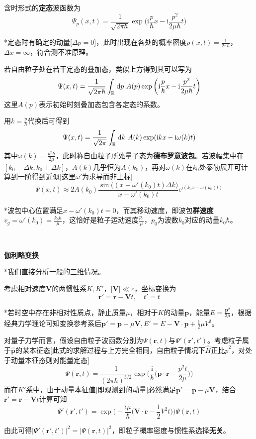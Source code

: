 \documentclass[a4paper,UTF8,fontset=windows]{ctexart}
\newcommand*{\dr}{\hspace{0.07em}\mathrm{d}}
\newcommand*{\ir}{\mathrm{i}}
\newcommand*{\er}{\mathrm{e}}
\newcommand*{\br}{\mathbf{r}}
\newcommand*{\bp}{\mathbf{p}}
\begin{document}
含时形式的\textbf{定态}波函数为
$$\Psi_p(x,t)=\frac{1}{\sqrt{2\pi\hbar}}\exp\bigg(\ir\frac{p}{\hbar}x-\ir\frac{p^2}{2\mu\hbar}t\bigg)$$

*定态时有确定的动量[$\Delta p=0$]，此时出现在各处的概率密度$\rho(x,t)=\frac{1}{2\pi\hbar}$，$\Delta x=\infty$，符合测不准原理。

若自由粒子处在若干定态的叠加态，类似上方得到其可以写为
$$\Psi(x,t)=\frac{1}{\sqrt{2\pi\hbar}}\int_\mathbb{R}\dr p\ A(p)\exp\bigg(\ir\frac{p}{\hbar}x-\ir\frac{p^2}{2\mu\hbar}t\bigg)$$
这里$A(p)$表示初始时刻叠加态包含各定态的系数。

用$k=\frac{p}{\hbar}$代换后可得到
$$\Psi(x,t)=\frac{1}{\sqrt{2\pi}}\int_\mathbb{R}\dr k\ A(k)\exp(\ir kx-\ir\omega(k)t)$$
其中$\omega(k)=\frac{k^2\hbar}{2\mu}$，此时称自由粒子所处量子态为\textbf{德布罗意波包}。若波幅集中在$[k_0-\Delta k,k_0+\Delta k]$，$A(k)$几乎恒为$A(k_0)$，再对$\omega(k)$在$k_0$处泰勒展开可计算到一阶得到近似[这里$\omega'$为求导而非上标]
$$\Psi(x,t)\approx 2A(k_0)\frac{\sin\big((x-\omega'(k_0)t)\Delta k\big)}{x-\omega'(k_0)t}\er^{\ir(k_0x-\omega(k_0)t)}$$

*波包中心位置满足$x-\omega'(k_0)t=0$，而其移动速度，即波包\textbf{群速度}$v_g=\omega'(k_0)=\frac{k_0\hbar}{\mu}$，这恰好是粒子运动速度$\frac{p_0}{\mu}$，$p_0$为波数$k_0$对应的动量$k_0\hbar$。

\

\textbf{伽利略变换}

*我们直接分析一般的三维情况。

考虑相对速度$\mathbf{V}$的两惯性系$K,K'$，$|\mathbf{V}|\ll c$，坐标变换为
$$\br'=\br-\mathbf{V}t,\quad t'=t$$

*若时空中存在非相对性质点，静止质量$\mu$，相对于$K$的动量$\bp$，能量$E=\frac{\bp^2}{2\mu}$，根据经典力学理论可知变换参考系后$\bp'=\bp-\mu\mathbf{V},E'=E-\mathbf{V}\cdot\bp+\frac{1}{2}\mu V^2$。

对量子力学而言，假设自由粒子波函数分别为$\Psi(\br,t)$与$\Psi'(\br',t')$。考虑粒子属于$\hat{\bp}$的某本征态[此式的求解过程与上方完全相同，自由粒子情况下$\hat{H}$正比$\hat{p}^2$，对处于动量本征态则对能量定态]
$$\Psi(\br,t)=\frac{1}{(2\pi\hbar)^{3/2}}\exp\bigg(\frac{\ir}{\hbar}\bigg(\bp\cdot\br-\frac{p^2t}{2\mu}\bigg)\bigg)$$
而在$K'$系中，由于动量本征值[即观测到的动量]必然满足$\bp'=\bp-\mu\mathbf{V}$，结合$\br'=\br-\mathbf{V}t$计算可知
$$\Psi'(\br',t')=\exp\bigg(-\frac{\ir\mu}{\hbar}\bigg(\mathbf{V}\cdot\br-\frac{1}{2}V^2t\bigg)\bigg)\Psi(\br,t)$$

由此可得$|\Psi'(\br',t')|^2=|\Psi(\br,t)|^2$，即粒子概率密度与惯性系选择\textbf{无关}。
\end{document}
